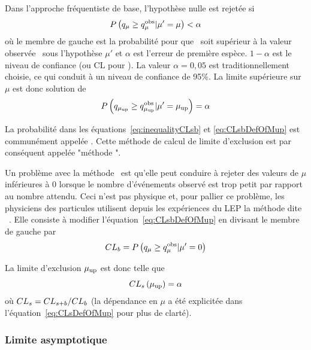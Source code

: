 Dans l'approche fr\'equentiste de base, l'hypoth\`ese nulle est rejet\'ee si
\begin{equation}
\label{eq:inequalityCLsb}
P\left(q_\mu\geq q_\mu^{\text{obs}}|\mu'=\mu\right)<\alpha
\end{equation}
o\`u le membre de gauche est la probabilit\'e pour que \qmu~soit sup\'erieur \`a la valeur observ\'ee \qmuobs~sous l'hypoth\`ese $\mu'$ et $\alpha$ est l'erreur de premi\`ere esp\`ece. $1-\alpha$ est le niveau de confiance (ou CL pour ). La valeur $\alpha=0,05$ est traditionnellement choisie, ce qui conduit \`a un niveau de confiance de 95\%. La limite sup\'erieure sur $\mu$ est donc solution de
\begin{equation}
\label{eq:CLsbDefOfMup}
P\left(q_{\mu_\text{up}}\geq q_{\mu_\text{up}}^{\text{obs}}|\mu'=\mu_{\text{up}}\right)=\alpha
\end{equation}

La probabilit\'e dans les équations~\ref{eq:inequalityCLsb} et \ref{eq:CLsbDefOfMup} est commun\'ement appel\'ee \CLsb. Cette m\'ethode de calcul de limite d'exclusion est par cons\'equent appel\'ee "m\'ethode \CLsb". 

Un probl\`eme avec la m\'ethode \CLsb~est qu'elle peut conduire \`a rejeter des valeurs de $\mu$ inf\'erieures \`a 0 lorsque le nombre d'\'ev\'enements observ\'e est trop petit par rapport au nombre attendu. Ceci n'est pas physique et, pour pallier ce probl\`eme, les physiciens des particules utilisent depuis les exp\'eriences du LEP la m\'ethode dite \CLs~\cite{0954-3899-28-10-313}. Elle consiste \`a modifier l'équation~\ref{eq:CLsbDefOfMup} en divisant le membre de gauche par 
\begin{equation}
\label{eq:CLbdefinition}
CL_b=P\left(q_\mu\geq q_\mu^{\text{obs}}|\mu'=0\right)
\end{equation}

La limite d'exclusion $\mu_{\text{up}}$ est donc telle que
\begin{equation}
\label{eq:CLsDefOfMup}
CL_s\left(\mu_{\text{up}}\right)=\alpha
\end{equation}
o\`u $CL_s=CL_{s+b}/CL_b$ (la d\'ependance en $\mu$ a \'et\'e explicit\'ee dans l'équation~\ref{eq:CLsDefOfMup} pour plus de clart\'e).

\subsubsection{Limite asymptotique}
\label{sec:limiteAsymptotique}

